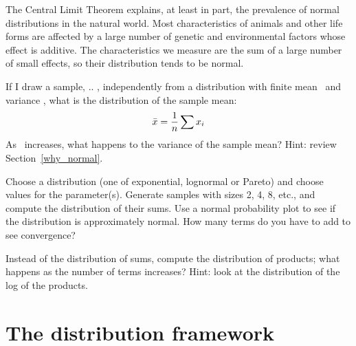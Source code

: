 \documentclass[12pt]{book}
\begin{document}

The Central Limit Theorem explains, at least in part, the prevalence
of normal distributions in the natural world.  Most characteristics of
animals and other life forms are affected by a large number of genetic
and environmental factors whose effect is additive.  The characteristics
we measure are the sum of a large number of small effects, so their
distribution tends to be normal.

\begin{exercise}
If I draw a sample, \x{} .. \x{}, independently from a
distribution with finite mean \mymu~and variance \sigmasq, what is
the distribution of the sample mean:
%
\[ \bar{x} = \frac{1}{n} \sum x_i \]
%
As \n~increases, what happens to the variance of the sample mean?
Hint: review Section~\ref{why_normal}.

\end{exercise}

\begin{exercise}
Choose a distribution (one of exponential, lognormal or Pareto) and
choose values for the parameter(s).  Generate samples with sizes
2, 4, 8, etc., and compute the distribution of their sums.  Use
a normal probability plot to see if the distribution is approximately
normal.  How many terms do you have to add to see convergence?

\end{exercise}


\begin{exercise}
Instead of the distribution of sums, compute the distribution of
products; what happens as the number of terms increases?
Hint: look at the distribution of the log of the products.

\end{exercise}

\section{The distribution framework}
\end{document}

